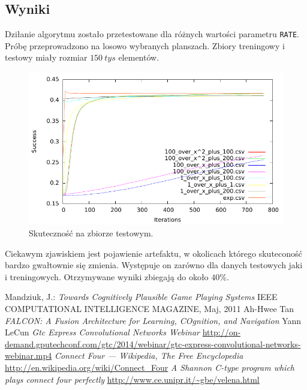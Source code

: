 \documentclass{llncs}
\begin{document}
\subsection{Wyniki}
Dziłanie algorytmu zostało przetestowane dla różnych wartości parametru \texttt{RATE}. Próbę przeprowadzono na 
losowo wybranych planszach. Zbiory treningowy i testowy miały rozmiar $150~tys$ elementów.

\begin{figure}[H]
	\centering	
	\includegraphics[width=\textwidth]{img/test}	\caption{Skuteczność na zbiorze testowym.}
	\label{fig:Siec}
\end{figure}

Ciekawym zjawiskiem jest pojawienie artefaktu, w okolicach którego skuteconość bardzo gwałtownie się zmienia.
Występuje on zarówno dla danych testowych jaki i treningowych.
Otrzymywane wyniki zbiegają do około $40\%$.



%
%
\begin{thebibliography}{4}
%
Mandziuk, J.:
\textsl{Towards Cognitively Plausible Game Playing Systems}
IEEE COMPUTATIONAL INTELLIGENCE MAGAZINE, Maj, 2011
Ah-Hwee Tan
\textsl{FALCON: A Fusion Architecture for Learning, COgnition, and Navigation}
Yann LeCun
\textsl{Gtc Express Convolutional Networks Webinar}
\url{http://on-demand.gputechconf.com/gtc/2014/webinar/gtc-express-convolutional-networks-webinar.mp4}
\textsl{Connect Four --- {W}ikipedia{,} The Free Encyclopedia}
\url{http://en.wikipedia.org/wiki/Connect_Four}
\textsl{A Shannon C-type program which plays connect four perfectly}
\url{http://www.ce.unipr.it/~gbe/velena.html}
\end{thebibliography}
\end{document}
